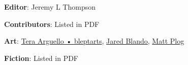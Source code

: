 \begin{description}

\item {\bfseries Editor}: Jeremy L Thompson

\item {\bfseries Contributors}: Listed in PDF

\item {\bfseries Art}: \href{https://ko-fi.com/bleptarts}{Tera Arguello • bleptarts}, \href{https://jaredblando.com}{Jared Blando}, \href{https://www.deviantart.com/mattplog}{Matt Plog}

\item {\bfseries Fiction}: Listed in PDF

\end{description}
